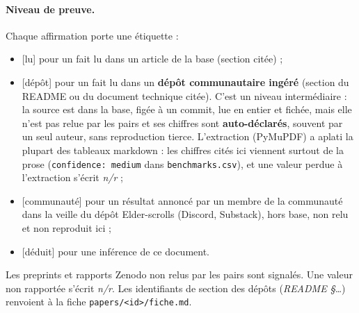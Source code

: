 \documentclass[11pt,a4paper]{article}
\newcommand{\lu}{\textsf{\small[lu]}}
\newcommand{\deduit}{\textsf{\small[déduit]}}
\newcommand{\commu}{\textsf{\small[communauté]}}
\newcommand{\depot}{\textsf{\small[dépôt]}}
\newcommand{\nr}{\textit{n/r}}
\begin{document}
\paragraph{Niveau de preuve.} Chaque affirmation porte une étiquette :
\begin{itemize}
  \item \lu{} pour un fait lu dans un article de la base (section citée) ;
  \item \depot{} pour un fait lu dans un \textbf{dépôt communautaire ingéré} (section du
  README ou du document technique citée). C'est un niveau intermédiaire : la source est
  dans la base, figée à un commit, lue en entier et fichée, mais elle n'est pas relue par
  les pairs et ses chiffres sont \textbf{auto-déclarés}, souvent par un seul auteur, sans
  reproduction tierce. L'extraction (PyMuPDF) a aplati la plupart des tableaux markdown :
  les chiffres cités ici viennent surtout de la prose (\texttt{confidence: medium} dans
  \texttt{benchmarks.csv}), et une valeur perdue à l'extraction s'écrit \nr{} ;
  \item \commu{} pour un résultat annoncé par un membre de la communauté dans la veille du
  dépôt Elder-scrolls (Discord, Substack), hors base, non relu et non reproduit ici ;
  \item \deduit{} pour une inférence de ce document.
\end{itemize}
Les preprints et rapports Zenodo non relus par les pairs sont signalés. Une valeur non
rapportée s'écrit \nr. Les identifiants de section des dépôts (\emph{README §…}) renvoient à
la fiche \nolinkurl{papers/<id>/fiche.md}.
\end{document}
